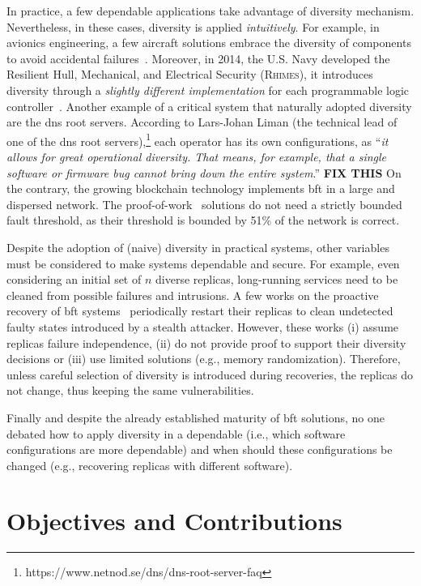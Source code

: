 In practice, a few dependable applications take advantage of diversity mechanism. 
Nevertheless, in these cases, diversity is applied \emph{intuitively}.
For example, in avionics engineering, a few aircraft solutions embrace the diversity of components to avoid accidental failures~\cite{Yeh:2004}.
Moreover, in 2014, the U.S. Navy developed the Resilient Hull, Mechanical, and Electrical Security (\textsc{Rhimes}), it introduces diversity through a \emph{slightly different implementation} for each programmable logic controller~\cite{rhimes}.
Another example of a critical system that naturally adopted diversity are the \gls{dns} root servers. 
According to Lars-Johan Liman (the technical lead of one of the \gls{dns} root servers),\footnote{https://www.netnod.se/dns/dns-root-server-faq} each operator has its own configurations, as ``\emph{it allows for great operational diversity. That means, for example, that a single software or firmware bug cannot bring down the entire system}.''
\textbf{FIX THIS} On the contrary, the growing blockchain technology implements \gls{bft} in a large and dispersed network.
The proof-of-work~\cite{} solutions do not need a strictly bounded fault threshold, as their threshold is bounded by 51\% of the network is correct.


Despite the adoption of (naive) diversity in practical systems, other variables must be considered to make systems dependable and secure.
For example, even considering an initial set of $n$ diverse replicas, long-running services need to be cleaned from possible failures and intrusions.
A few works on the proactive recovery of \gls{bft} systems~\cite{Castro:2002,Sousa:2010,Roeder:2010,Platania:2014,Distler:2011} periodically restart their replicas to clean undetected faulty states introduced by a stealth attacker. 
However, these works (i) assume replicas failure independence, (ii) do not provide proof to support their diversity decisions or (iii) use limited solutions (e.g., memory randomization).
Therefore, unless careful selection of diversity is introduced during recoveries, the replicas do not change, thus keeping the same vulnerabilities.


Finally and despite the already established maturity of \gls{bft} solutions, no one debated how to apply diversity in a dependable (i.e., which software configurations are more dependable) and when should these configurations be changed (e.g., recovering replicas with different software).

\section{Objectives and Contributions}

